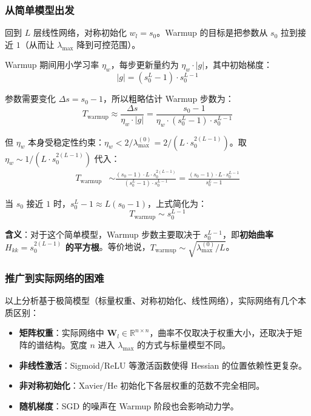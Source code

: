 \documentclass[12pt, a4paper]{ctexart}
\begin{document}
\subsubsection{从简单模型出发}

回到 $L$ 层线性网络，对称初始化 $w_l = s_0$。Warmup 的目标是把参数从 $s_0$ 拉到接近 $1$（从而让 $\lambda_{\max}$ 降到可控范围）。

Warmup 期间用小学习率 $\eta_w$，每步更新量约为 $\eta_w \cdot |g|$，其中初始梯度：
\begin{equation}
    |g| = (s_0^L - 1) \cdot s_0^{L-1}
\end{equation}

参数需要变化 $\Delta s = s_0 - 1$，所以粗略估计 Warmup 步数为：
\begin{equation}
    T_{\text{warmup}} \approx \frac{\Delta s}{\eta_w \cdot |g|} = \frac{s_0 - 1}{\eta_w \cdot (s_0^L - 1) \cdot s_0^{L-1}}
\end{equation}

但 $\eta_w$ 本身受稳定性约束：$\eta_w < 2/\lambda_{\max}^{(0)} = 2/(L \cdot s_0^{2(L-1)})$。取 $\eta_w \sim 1/(L \cdot s_0^{2(L-1)})$ 代入：
\begin{align}
    T_{\text{warmup}} &\sim \frac{(s_0-1) \cdot L \cdot s_0^{2(L-1)}}{(s_0^L - 1) \cdot s_0^{L-1}} = \frac{(s_0-1) \cdot L \cdot s_0^{L-1}}{s_0^L - 1}
\end{align}

当 $s_0$ 接近 $1$ 时，$s_0^L - 1 \approx L(s_0-1)$，上式简化为：
\begin{equation}
    T_{\text{warmup}} \sim s_0^{L-1}
\end{equation}

\textbf{含义}：对于这个简单模型，Warmup 步数主要取决于 $s_0^{L-1}$，即\textbf{初始曲率 $H_{kk} = s_0^{2(L-1)}$ 的平方根}。等价地说，$T_{\text{warmup}} \sim \sqrt{\lambda_{\max}^{(0)}/L}$。

\subsubsection{推广到实际网络的困难}

以上分析基于极简模型（标量权重、对称初始化、线性网络），实际网络有几个本质区别：
\begin{itemize}
    \item \textbf{矩阵权重}：实际网络中 $\mathbf{W}_l \in \mathbb{R}^{n \times n}$，曲率不仅取决于权重大小，还取决于矩阵的谱结构。宽度 $n$ 进入 $\lambda_{\max}$ 的方式与标量模型不同。
    \item \textbf{非线性激活}：Sigmoid/ReLU 等激活函数使得 Hessian 的位置依赖性更复杂。
    \item \textbf{非对称初始化}：Xavier/He 初始化下各层权重的范数不完全相同。
    \item \textbf{随机梯度}：SGD 的噪声在 Warmup 阶段也会影响动力学。
\end{itemize}
\end{document}
